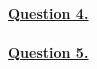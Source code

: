 \documentclass[12pt]{article}
\begin{document}
\newpage
\noindent \hyperlink{toc}{\hypertarget{4}{\LARGE \underline{\textbf{Question 4.}}}}\\\\
\newpage
\noindent \hyperlink{toc}{\hypertarget{5}{\LARGE \underline{\textbf{Question 5.}}}}\\\\
\end{document}
